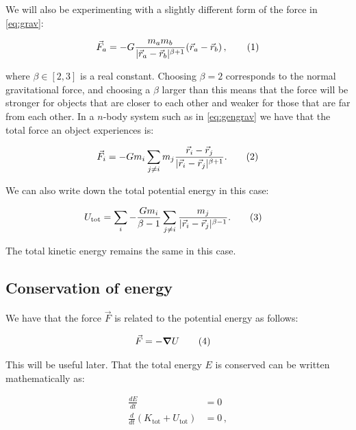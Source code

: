 \documentclass[reprint,english,notitlepage]{revtex4-1}  %
\newcommand\numberthis{\addtocounter{equation}{1}\tag{\theequation}}
\begin{document}
We will also be experimenting with a slightly different form of the force in \eqref{eq:grav}:

\begin{align*}
\vec{F}_a = - G \frac{m_a m_b}{|\vec{r}_a - \vec{r}_b|^{\beta + 1} } ( \vec{r}_a - \vec{r}_b) \, , \numberthis \label{eq:beta_grav}
\end{align*}

where $\beta \in [2,3]$ is a real constant. Choosing $\beta = 2$ corresponds to the normal gravitational force, and choosing a $\beta$ larger than this means that the force will be stronger for objects that are closer to each other and weaker for those that are far from each other. In a $n$-body system such as in \eqref{eq:gengrav} we have that the total force an object experiences is:

\begin{align*}
\vec{F}_{i} = -Gm_{i}\sum_{j\neq i}m_{j}\frac{\vec{r}_{i}-\vec{r}_{j}}{|\vec{r}_{i}-\vec{r}_{j}|^{\beta + 1}}. \numberthis \label{eq:beta_gengrav}
\end{align*}

We can also write down the total potential energy in this case:

\begin{align*}
U_\text{tot} &= \sum\limits_i - \frac{G m_i}{\beta - 1} \sum\limits_{j\neq i} \frac{m_j}{|\vec{r}_i - \vec{r}_j|^{\beta-1}} . \numberthis \label{eq:beta_tot_pot_en}
\end{align*}

The total kinetic energy remains the same in this case.

\subsection{Conservation of energy} \label{sec:II:c}

We have that the force $\vec{F}$ is related to the potential energy as follows:

\begin{align*}
\vec{F} &= - \gradient U \numberthis \label{eq:force_pot_en}
\end{align*}

This will be useful later. That the total energy $E$ is conserved can be written mathematically as:

\begin{align*}
\frac{dE}{dt} &= 0 \\
\frac{d}{dt} (K_\text{tot} + U_\text{tot}) &= 0 \, ,
\end{align*}
\end{document}

